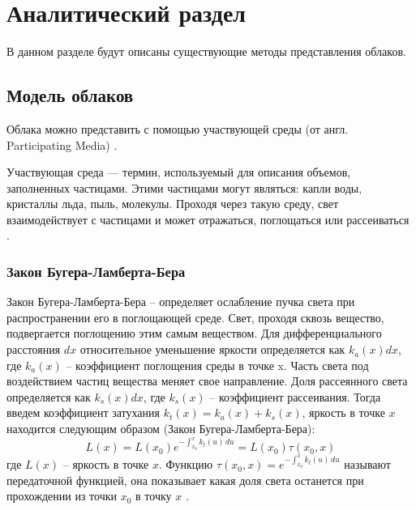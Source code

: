 \chapter{Аналитический раздел}

В данном разделе будут описаны существующие методы представления облаков.

\section{Модель облаков}
\label{math}
Облака можно представить с помощью участвующей среды (от англ. Participating Media) \cite{partmedia, frostbite, hzd, clouds}.

Участвующая среда --- термин, используемый для описания объемов, заполненных частицами. Этими частицами могут являться: капли воды, кристаллы льда, пыль, молекулы. Проходя через такую среду, свет взаимодействует с частицами и может отражаться, поглощаться или рассеиваться \cite{frostbite}.  

\subsection{Закон Бугера-Ламберта-Бера}
Закон Бугера-Ламберта-Бера -- определяет ослабление пучка света при распространении его в поглощающей среде. 
Свет, проходя сквозь вещество, подвергается поглощению этим самым веществом. Для дифференциального расстояния $ dx $ относительное уменьшение яркости определяется как $ k_a(x)dx $, где $ k_a(x) $ -- коэффициент поглощения среды в точке x. Часть света под воздействием частиц вещества меняет свое направление. Доля рассеянного света определяется как $ k_s(x)dx $, где $ k_s(x) $ -- коэффициент рассеивания. Тогда введем коэффициент затухания $ k_t(x)  = k_a(x) + k_s(x) $, яркость в точке $x$ находится следующим образом (Закон Бугера-Ламберта-Бера):  
\begin{equation}
	\label{beers_law}
	L(x) = L(x_0) e^{-\int_{x_0}^{x} k_t(u)\,du}=L(x_0)\tau(x_0, x) 
\end{equation}
где $ L(x) $ -- яркость в точке $ x $. Функцию $ \tau(x_0, x) = e^{-\int_{x_0}^{x} k_t(u)\,du}  $ называют передаточной функцией, она показывает какая доля света останется при прохождении из точки $ x_0 $ в точку $ x $ \cite{partmedia}.

